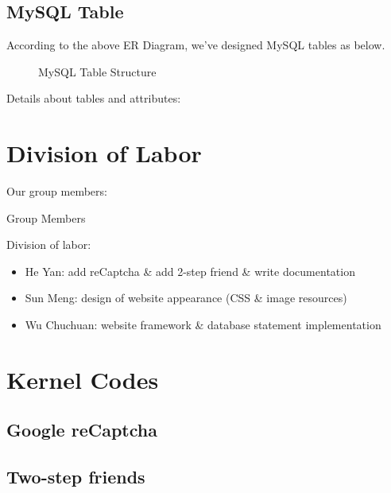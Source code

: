 \subsection{MySQL Table}

According to the above ER Diagram, we've designed MySQL tables as below.

\begin{figure}[htbp]
\begin{center}

\end{center}
\caption{MySQL Table Structure}
\end{figure}

Details about tables and attributes:



\section{Division of Labor}

Our group members:

\begin{table}[htbp]
	\begin{center}
		
	\end{center}
	\caption{Group Members}
\end{table}

Division of labor:

\begin{itemize}
	\item He Yan: add reCaptcha \& add 2-step friend \& write documentation
	\item Sun Meng: design of website appearance (CSS \& image resources)
	\item Wu Chuchuan: website framework \& database statement implementation
\end{itemize}

\section{Kernel Codes}

\subsection{Google reCaptcha}


\subsection{Two-step friends}


